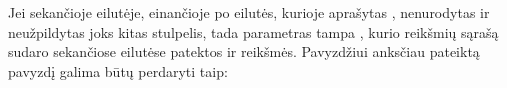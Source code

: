 \documentclass[letterpaper,10pt,lithuanian]{sphinxmanual}
\begin{document}
\sphinxAtStartPar
Jei sekančioje {\hyperref[\detokenize{savokos:term-DSA}]{}} eilutėje, einančioje po eilutės, kurioje aprašytas
{\hyperref[\detokenize{dimensijos:param}]{}}, nenurodytas {\hyperref[\detokenize{tipai:module-type}]{}} ir neužpildytas joks kitas
{\hyperref[\detokenize{savokos:term-dimensija}]{}} stulpelis, tada parametras tampa
{\hyperref[\detokenize{savokos:term-iteratorius}]{}}, kurio reikšmių sąrašą sudaro sekančiose
eilutėse patektos {\hyperref[\detokenize{formatas:source}]{}} ir {\hyperref[\detokenize{formatas:prepare}]{}} reikšmės. Pavyzdžiui
anksčiau pateiktą pavyzdį galima būtų perdaryti taip:
\end{document}
